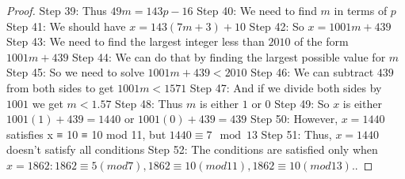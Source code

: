 \documentclass{article}
\begin{document}
\begin{proof}
Step 39: Thus $49m = 143p -16$
Step 40: We need to find $m$ in terms of $p$
Step 41: We should have $x = 143(7m + 3)+ 10$
Step 42: So $x = 1001m + 439$
Step 43: We need to find the largest integer less than $2010$ of the form $1001m + 439$
Step 44: We can do that by finding the largest possible value for $m$
Step 45: So we need to solve $1001m + 439 < 2010$
Step 46: We can subtract $439$ from both sides to get $1001m < 1571$
Step 47: And if we divide both sides by $1001$ we get $m < 1.57$
Step 48: Thus $m$ is either $1$ or $0$
Step 49: So $x$ is either $1001(1) + 439 = 1440$ or $1001(0) + 439 = 439$
Step 50: However, $x=1440$ satisfies x ≡ 10 ≡ 10 mod 11, but $1440\equiv7\mod{13}$
Step 51: Thus, $x=1440$ doesn't satisfy all conditions
Step 52: The conditions are satisfied only when $x=1862: 1862 \equiv 5(mod 7), 1862 ≡ 10 (mod 11), 1862 ≡ 10 (mod 13).$.
\end{proof}
\end{document}
